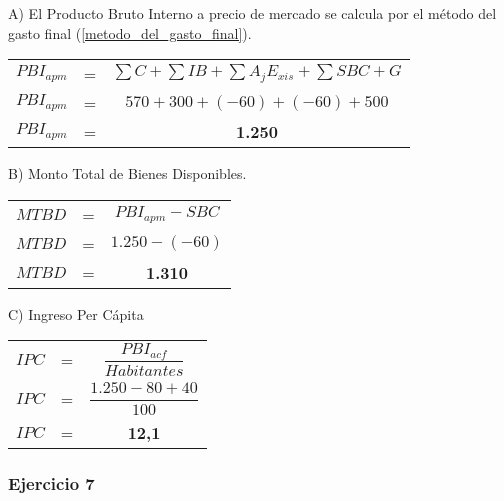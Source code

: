 \documentclass[12pt,a4paper]{article}
\begin{document}
        A) El Producto Bruto Interno a precio de mercado se calcula por el método del gasto final (\ref{metodo_del_gasto_final}).
        
		\begin{table}[H]
		\centering
        	\begin{tabular}{ c c c }
               	$PBI_{apm}$ &=& $\sum C + \sum IB + \sum {A}_{j} {E}_{xis} + \sum SBC + G $\\
                $ PBI_{apm} $ &=& $ 570 + 300 + ( -60 ) + ( -60 ) + 500 $ \\
                $ PBI_{apm} $ &=& \textbf{1.250}
			\end{tabular}
		\end{table}
        
        \hrulefill
        
        B) Monto Total de Bienes Disponibles.
        
		\begin{table}[H]
		\centering
        	\begin{tabular}{ c c c }
               	$ MTBD $ &=& $ PBI_{apm} - SBC $ \\
                $ MTBD $ &=& $ 1{.}250 - ( -60 ) $ \\
                $ MTBD $ &=& \textbf{1.310}
			\end{tabular}
		\end{table}
        
        \hrulefill
        
        C) Ingreso Per Cápita
        
		\begin{table}[H]
		\centering
        	\begin{tabular}{ c c c }
	            \vspace{0.3cm}
               	$ IPC $ &=& $ \dfrac{PBI_{acf}}{Habitantes} $ \\ \vspace{0.3cm}
                $ IPC $ &=& $ \dfrac{1{.}250-80+40}{100}$ \\
                $ IPC $ &=& \textbf{12,1}
			\end{tabular}
		\end{table}

        
        \newpage
    
    	\subsubsection{Ejercicio 7}
        
\end{document}
